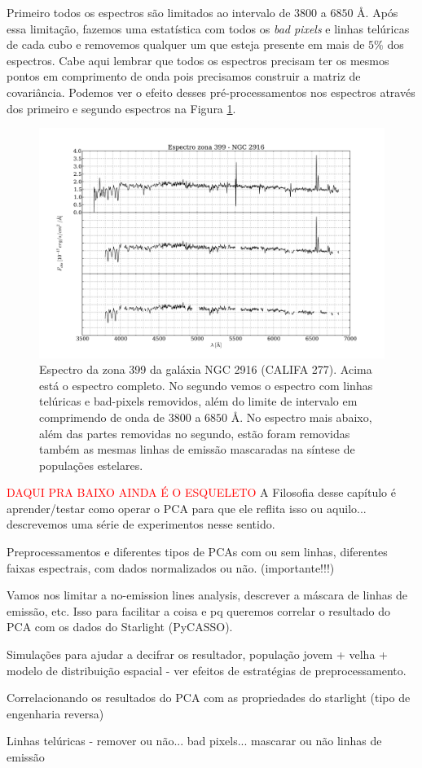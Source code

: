 Primeiro todos os espectros são limitados ao intervalo de $3800$ a $6850$ \AA. Após essa limitação, fazemos uma
estatística com todos os {\em bad pixels} e linhas telúricas de cada cubo e removemos qualquer um que esteja presente em
mais de $5\%$ dos espectros. Cabe aqui lembrar que todos os espectros precisam ter os mesmos pontos em comprimento de
onda pois precisamos construir a matriz de covariância. Podemos ver o efeito desses pré-processamentos nos espectros
através dos primeiro e segundo espectros na Figura \ref{fig:UsoPCA:checkmask}.

\begin{figure}
    \includegraphics[width=1.0\textwidth]{figuras/K0277-constant_inital_mask-399.pdf}
    \caption[Exemplo de máscaras em um espectro do cubo de dados.]
    {Espectro da zona 399 da galáxia NGC 2916 (CALIFA 277). Acima está o espectro completo. No segundo vemos o espectro
    com linhas telúricas e bad-pixels removidos, além do limite de intervalo em comprimendo de onda de $3800$ a $6850$
    \AA. No espectro mais abaixo, além das partes removidas no segundo, estão foram removidas também as mesmas linhas de
    emissão mascaradas na síntese de populações estelares.}
    \label{fig:UsoPCA:checkmask}
\end{figure}



\textcolor{red}{DAQUI PRA BAIXO AINDA É O ESQUELETO}
\ojo A Filosofia desse capítulo é aprender/testar como operar o PCA para que ele
reflita isso ou aquilo... descrevemos uma série de experimentos nesse sentido.

Preprocessamentos e diferentes tipos de PCAs com ou sem linhas, diferentes
faixas espectrais, com dados normalizados ou não. (importante!!!)

Vamos nos limitar a no-emission lines analysis, descrever a máscara de linhas de
emissão, etc. Isso para facilitar a coisa e pq queremos correlar o resultado do
PCA com os dados do Starlight (PyCASSO).

Simulações para ajudar a decifrar os resultador, população jovem + velha +
modelo de distribuição espacial - ver efeitos de estratégias de
preprocessamento.

Correlacionando os resultados do PCA com as propriedades do starlight (tipo de
engenharia reversa)

Linhas telúricas - remover ou não... bad pixels... mascarar ou não linhas de
emissão